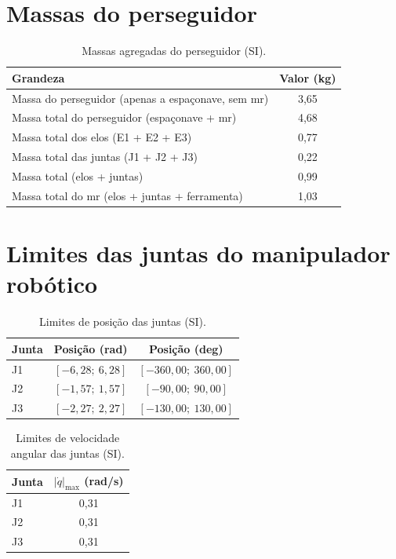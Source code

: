 \section{Massas do perseguidor}

\begin{table}[H]
\centering
\caption{Massas agregadas do perseguidor (SI).}
\label{tab_perseguidor_massas_agregadas_SI}
\begin{tabular}{lc}
\hline
\textbf{Grandeza} & \textbf{Valor (kg)} \\
\hline
Massa do perseguidor (apenas a espaçonave, sem \gls{mr}) & 3,65 \\
Massa total do perseguidor (espaçonave + \gls{mr}) & 4,68 \\
Massa total dos elos (E1 + E2 + E3) & 0,77 \\
Massa total das juntas (J1 + J2 + J3) & 0,22 \\
Massa total (elos + juntas) & 0,99 \\
Massa total do \gls{mr} (elos + juntas + ferramenta) & 1,03 \\
\hline
\end{tabular}
\end{table}



\section{Limites das juntas do manipulador robótico}

\begin{table}[H]
\centering
\caption{Limites de posição das juntas (SI).}
\label{tab_perseguidor_lim_pos_SI}
\begin{tabular}{lcc}
\hline
\textbf{Junta} & \textbf{Posição (rad)} & \textbf{Posição (deg)} \\
\hline
J1 & $[-6,28;\ 6,28]$ & $[-360,00;\ 360,00]$ \\
J2 & $[-1,57;\ 1,57]$ & $[-90,00;\ 90,00]$ \\
J3 & $[-2,27;\ 2,27]$ & $[-130,00;\ 130,00]$ \\
\hline
\end{tabular}
\end{table}


\begin{table}[H]
\centering
\caption{Limites de velocidade angular das juntas (SI).}
\label{tab_perseguidor_lim_vel_SI}
\begin{tabular}{lc}
\hline
\textbf{Junta} & \textbf{$|\dot{q}|_{\max}$ (rad/s)} \\
\hline
J1 & 0,31 \\
J2 & 0,31 \\
J3 & 0,31 \\
\hline
\end{tabular}
\end{table}


